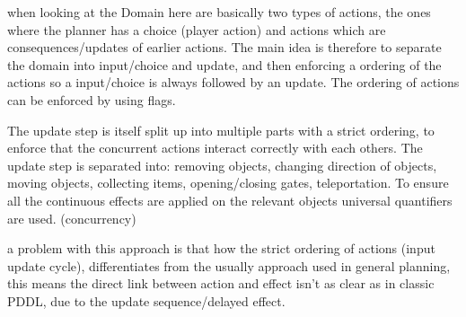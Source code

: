		when looking at the Domain here are basically two types of actions, the ones where the planner has a choice (player action) and actions which are consequences/updates of earlier actions. The main idea is therefore to separate the domain into input/choice and update, and then enforcing a ordering of the actions so a input/choice is always followed by an update. The ordering of actions can be enforced by using flags.	
		
		The update step is itself split up into multiple parts with a strict ordering, to enforce that the concurrent actions interact correctly with each others. The update step is separated into: removing objects, changing direction of objects, moving objects, collecting items, opening/closing gates, teleportation. To ensure all the continuous effects are applied on the relevant objects universal quantifiers are used. (concurrency)
		
		a problem with this approach is that how the strict ordering of actions (input update cycle), differentiates from the usually approach used in general planning, this means the direct link between action and effect isn't as clear as in classic PDDL, due to the update sequence/delayed effect. 
		
	

	
	

